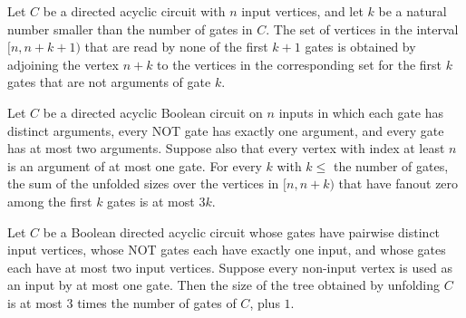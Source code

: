 \begin{theorem}
\label{BoolCircuit.DAGCircuit.rootSet_succ}
\leanok
{}
Let $C$ be a directed acyclic circuit with $n$ input vertices, and let $k$ be a natural
number smaller than the number of gates in $C$. The set of vertices in the interval
$[n,n+k+1)$ that are read by none of the first $k+1$ gates is obtained by adjoining the
vertex $n+k$ to the vertices in the corresponding set for the first $k$ gates that are
not arguments of gate $k$.
\end{theorem}

\begin{theorem}
\label{BoolCircuit.DAGCircuit.sum_rootSet_le}
\leanok
{}
Let $C$ be a directed acyclic Boolean circuit on $n$ inputs in which each gate has
distinct arguments, every NOT gate has exactly one argument, and every gate has at most
two arguments. Suppose also that every vertex with index at least $n$ is an argument of
at most one gate. For every $k$ with $k\leq$ the number of gates, the sum of the
unfolded sizes over the vertices in $[n,n+k)$ that have fanout zero among the first $k$
gates is at most $3k$.
\end{theorem}

\begin{theorem}
\label{BoolCircuit.DAGCircuit.toTree_size_le_of_fanout_le_one}
\leanok
{}
Let $C$ be a Boolean directed acyclic circuit whose gates have pairwise distinct input
vertices, whose NOT gates each have exactly one input, and whose gates each have at most
two input vertices. Suppose every non-input vertex is used as an input by at most one
gate. Then the size of the tree obtained by unfolding $C$ is at most $3$ times the
number of gates of $C$, plus $1$.
\end{theorem}

